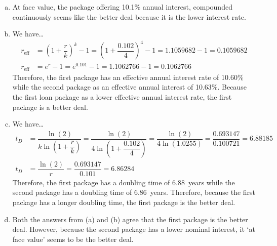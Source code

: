 \documentclass[11pt,letterpaper]{article}
\begin{document}
\sol 
\begin{enumerate}[(a)]
\item At face value, the package offering 10.1\% annual interest, compounded continuously seems like the better deal because it is the lower interest rate. \pspace

\item We have\dots
	\[
	\begin{aligned}
	r_{\text{eff}}&= \left(1 + \dfrac{r}{k} \right)^k - 1= \left(1 + \dfrac{0.102}{4} \right)^4 - 1= 1.1059682 - 1= 0.1059682 \\[0.3cm]
	r_{\text{eff}}&= e^r - 1= e^{0.101} - 1= 1.1062766 - 1= 0.1062766
	\end{aligned}
	\]
Therefore, the first package has an effective annual interest rate of 10.60\% while the second package as an effective annual interest of 10.63\%. Because the first loan package as a lower effective annual interest rate, the first package is a better deal. \pspace

\item We have\dots
	\[
	\begin{aligned}
	t_D&= \dfrac{\ln(2)}{k \ln \left( 1 + \dfrac{r}{k} \right)}= \dfrac{\ln(2)}{4 \ln \left( 1 + \dfrac{0.102}{4} \right)}= \dfrac{\ln(2)}{4 \ln(1.0255)}= \dfrac{0.693147}{0.100721}= 6.88185 \\
	t_D&= \dfrac{\ln(2)}{r}= \dfrac{0.693147}{0.101}= 6.86284
	\end{aligned}
	\]
Therefore, the first package has a doubling time of 6.88~years while the second package has a doubling time of 6.86~years. Therefore, because the first package has a longer doubling time, the first package is the better deal. \pspace

\item Both the answers from (a) and (b) agree that the first package is the better deal. However, because the second package has a lower nominal interest, it `at face value' seems to be the better deal.
\end{enumerate}
\end{document}
